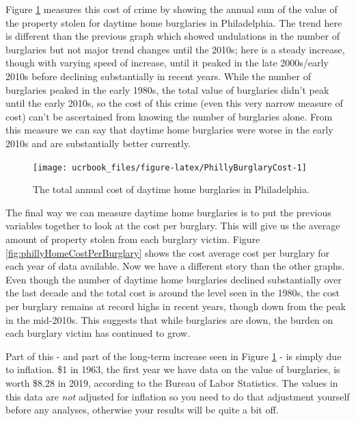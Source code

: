 \documentclass[
  12pt,
  openany]{book}
\begin{document}
Figure \ref{fig:PhillyBurglaryCost} measures this cost of crime by showing the annual sum of the value of the property stolen for daytime home burglaries in Philadelphia. The trend here is different than the previous graph which showed undulations in the number of burglaries but not major trend changes until the 2010s; here is a steady increase, though with varying speed of increase, until it peaked in the late 2000s/early 2010s before declining substantially in recent years. While the number of burglaries peaked in the early 1980s, the total value of burglaries didn't peak until the early 2010s, so the cost of this crime (even this very narrow measure of cost) can't be ascertained from knowing the number of burglaries alone. From this measure we can say that daytime home burglaries were worse in the early 2010s and are substantially better currently.

\begin{figure}

{\centering \texttt{[image: ucrbook\_files/figure-latex/PhillyBurglaryCost-1]} 

}

\caption{The total annual cost of daytime home burglaries in Philadelphia.}\label{fig:PhillyBurglaryCost}
\end{figure}

The final way we can measure daytime home burglaries is to put the previous variables together to look at the cost per burglary. This will give us the average amount of property stolen from each burglary victim. Figure \ref{fig:phillyHomeCostPerBurglary} shows the cost average cost per burglary for each year of data available. Now we have a different story than the other graphs. Even though the number of daytime home burglaries declined substantially over the last decade and the total cost is around the level seen in the 1980s, the cost per burglary remains at record highs in recent years, though down from the peak in the mid-2010s. This suggests that while burglaries are down, the burden on each burglary victim has continued to grow.

Part of this - and part of the long-term increase seen in Figure \ref{fig:PhillyBurglaryCost} - is simply due to inflation. \$1 in 1963, the first year we have data on the value of burglaries, is worth \$8.28 in 2019, according to the Bureau of Labor Statistics. The values in this data are \emph{not} adjusted for inflation so you need to do that adjustment yourself before any analyses, otherwise your results will be quite a bit off.
\end{document}

